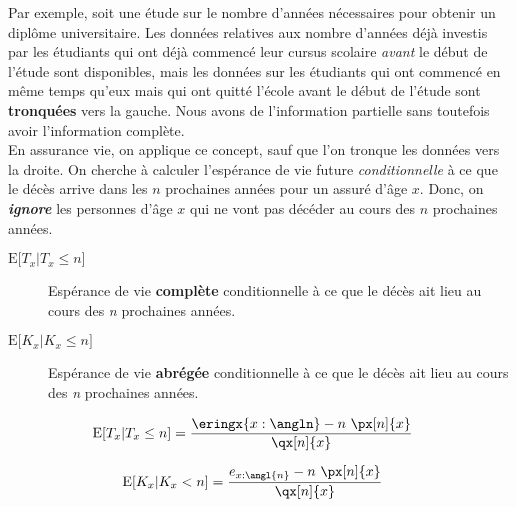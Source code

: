 \documentclass[10pt, french]{article}
\begin{document}
\begin{multicols*}{3}
\begin{rappel_enhanced}[Contexte]
Par exemple, soit une étude sur le nombre d'années nécessaires pour obtenir un diplôme universitaire. Les données relatives aux nombre d'années déjà investis par les étudiants qui ont déjà commencé leur cursus scolaire \textit{avant} le début de l'étude sont disponibles, mais les données sur les étudiants qui ont commencé en même temps qu'eux mais qui ont quitté l'école avant le début de l'étude sont \textbf{tronquées} vers la gauche. Nous avons de l'information partielle sans toutefois avoir l'information complète.\\

En assurance vie, on applique ce concept, sauf que l'on tronque les données vers la droite. On cherche à calculer l'espérance de vie future \textit{conditionnelle} à ce que le décès arrive dans les $n$ prochaines années pour un assuré d'âge $x$. Donc, on \textbf{\textit{ignore}} les personnes d'âge $x$ qui ne vont pas décéder au cours des $n$ prochaines années.
\end{rappel_enhanced}

\begin{distributions}[Notation]
\begin{description}
	\item[$\text{E}\lbrack T_x | T_x \leq n\rbrack$]	Espérance de vie \textbf{complète} conditionnelle à ce que le décès ait lieu au cours des \textit{n} prochaines années.
	\item[$\text{E}\lbrack K_x | K_x \leq n\rbrack$]	Espérance de vie \textbf{abrégée} conditionnelle à ce que le décès ait lieu au cours des \textit{n} prochaines années.
\end{description}
\end{distributions}


\begin{definitionNOHFILLsub}
\begin{align*}
	\text{E}[T_x | T_x \leq n]
	&=	\frac{\eringx{x:\angln} - n \ \px[n]{x}}{\qx[n]{x}} 
\end{align*}
\end{definitionNOHFILLsub}


\begin{definitionNOHFILLsub}
\begin{align*}
	\text{E}[K_x | K_x < n] 
	&=	\frac{e_{x:\angl{n}} - n \ \px[n]{x}}{\qx[n]{x}}
\end{align*}
\end{definitionNOHFILLsub}



\end{multicols*}
\end{document}
